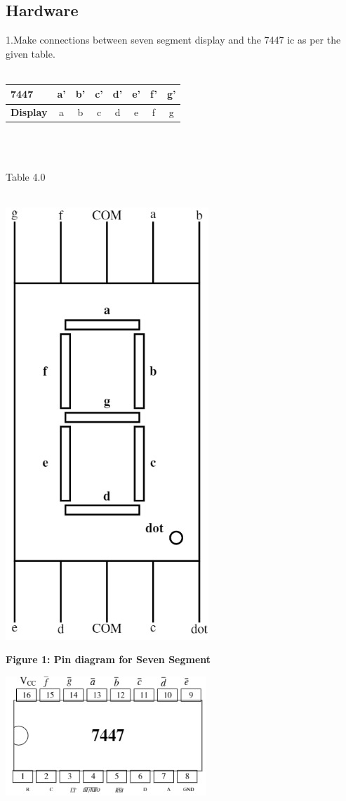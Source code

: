 \documentclass[10pt]{report}
\begin{document}
\begin{multicols}{2}
\section{Hardware}
\raggedright
1.Make connections between seven segment display and the 7447 ic as per the given table.\\
\
\centering
\\\begin{tabular}{|l|c|c|c|c|c|c|c|}
\hline
\textbf{7447} & a' & b' & c' & d' & e' & f' & g'\\
\hline
\textbf{Display} & a & b & c & d & e & f & g\\
\hline
\end{tabular}\\
\
\centerline{Table 4.0}\\
\includegraphics[scale=0.3]{sevenseg.jpeg}
\begin{center}
\centering\textbf{Figure 1: Pin diagram for Seven Segment}
\end{center}
\includegraphics[scale=0.5]{ic.jpeg}
\begin{center}


\end{center}
\end{multicols}
\end{document}
